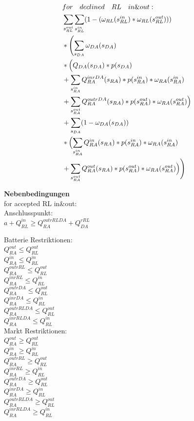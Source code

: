 \documentclass{article}
\begin{document}
\begin{equation}
    \begin{split}
&for\quad declined\quad RL\quad in \& out:\\
         &\sum_{s^{out}_{RL}}\sum_{s^{in}_{RL}} (1-(\omega_{RL}(s^{in}_{RL})*\omega_{RL}(s^{out}_{RL})))\\
    & *  \Biggl(\sum_{s_{DA}}\omega_{DA}(s_{DA}) \\
        & * \Bigl(Q_{DA}(s_{DA}) * p(s_{DA}) \\
	& + \sum_{s^{in}_{RA}} Q^{inrDA}_{RA}(s_{RA}) * p(s^{in}_{RA}) * \omega_{RA}(s^{in}_{RA})\\
	& + \sum_{s^{out}_{RA}} Q^{outrDA}_{RA}(s_{RA}) * p(s^{out}_{RA}) * \omega_{RA}(s^{out}_{RA})\Bigr)\\
    & + \sum_{s_{DA}}(1-\omega_{DA}(s_{DA})) \\
        & * \Bigl( \sum_{s^{in}_{RA}} Q^{in}_{RA}(s_{RA}) * p(s^{in}_{RA}) * \omega_{RA}(s^{in}_{RA})\\
	& + \sum_{s^{out}_{RA}} Q^{out}_{RA}(s_{RA}) * p(s^{out}_{RA}) * \omega_{RA}(s^{out}_{RA})\Bigr) \Biggr)
    \end{split}
\end{equation}



\textbf{Nebenbedingungen}\\
for accepted RL in\&out:\\
Anschlusspunkt:\\
$a + Q^{in}_{RL} \geq Q^{outrRLDA}_{RA} + Q^{rRL}_{DA}$ 

Batterie Restriktionen:\\
$Q^{out}_{RA} \leq Q^{out}_{RL} $\\
$Q^{in}_{RA} \leq Q^{in}_{RL} $\\
$Q^{outrRL}_{RA} \leq Q^{out}_{RL} $\\
$Q^{inrRL}_{RA} \leq Q^{in}_{RL} $\\
$Q^{outrDA}_{RA} \leq Q^{out}_{RL} $\\
$Q^{inrDA}_{RA} \leq Q^{in}_{RL} $\\
$Q^{outrRLDA}_{RA} \leq Q^{out}_{RL} $\\
$Q^{inrRLDA}_{RA} \leq Q^{in}_{RL} $\\
Markt Restriktionen:\\
$Q^{out}_{RA} \geq Q^{out}_{RL} $\\
$Q^{in}_{RA} \geq Q^{in}_{RL} $\\
$Q^{outrRL}_{RA} \geq Q^{out}_{RL} $\\
$Q^{inrRL}_{RA} \geq Q^{in}_{RL} $\\
$Q^{outrDA}_{RA} \geq Q^{out}_{RL} $\\
$Q^{inrDA}_{RA} \geq Q^{in}_{RL} $\\
$Q^{outrRLDA}_{RA} \geq Q^{out}_{RL} $\\
$Q^{inrRLDA}_{RA} \geq Q^{in}_{RL} $\\
\end{document}
